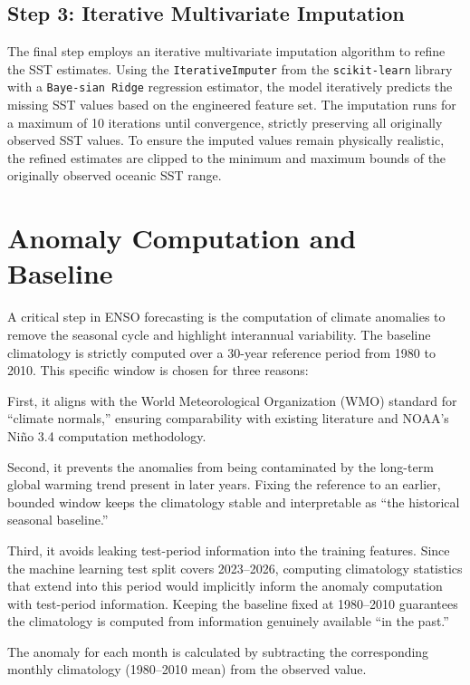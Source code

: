 \subsection{Step 3: Iterative Multivariate Imputation}
The final step employs an iterative multivariate imputation algorithm to refine the SST estimates. Using the \texttt{Iterative\allowbreak Imputer} from the \texttt{scikit-learn} library with a \texttt{Baye-\allowbreak sian Ridge} regression estimator, the model iteratively predicts the missing SST values based on the engineered feature set. The imputation runs for a maximum of 10 iterations until convergence, strictly preserving all originally observed SST values. To ensure the imputed values remain physically realistic, the refined estimates are clipped to the minimum and maximum bounds of the originally observed oceanic SST range.

\section{Anomaly Computation and Baseline}

A critical step in ENSO forecasting is the computation of climate anomalies to remove the seasonal cycle and highlight interannual variability. The baseline climatology is strictly computed over a 30-year reference period from 1980 to 2010. This specific window is chosen for three reasons:

First, it aligns with the World Meteorological Organization (WMO) standard for ``climate normals,'' ensuring comparability with existing literature and NOAA's Ni\~{n}o 3.4 computation methodology.

Second, it prevents the anomalies from being contaminated by the long-term global warming trend present in later years. Fixing the reference to an earlier, bounded window keeps the climatology stable and interpretable as ``the historical seasonal baseline.''

Third, it avoids leaking test-period information into the training features. Since the machine learning test split covers 2023--2026, computing climatology statistics that extend into this period would implicitly inform the anomaly computation with test-period information. Keeping the baseline fixed at 1980--2010 guarantees the climatology is computed from information genuinely available ``in the past.''

The anomaly for each month is calculated by subtracting the corresponding monthly climatology (1980--2010 mean) from the observed value.

